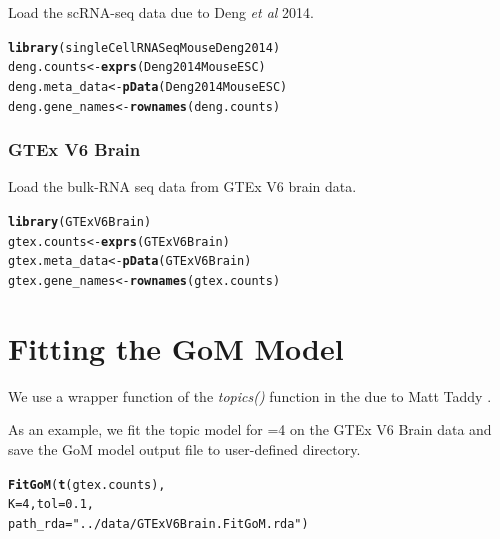 \documentclass[12pt]{article}\usepackage[]{graphicx}\usepackage[usenames,dvipsnames]{color}
\makeatletter
\newcommand{\hlnum}[1]{\textcolor[rgb]{0.686,0.059,0.569}{#1}}%
\newcommand{\hlstr}[1]{\textcolor[rgb]{0.192,0.494,0.8}{#1}}%
\newcommand{\hlstd}[1]{\textcolor[rgb]{0.345,0.345,0.345}{#1}}%
\newcommand{\hlkwb}[1]{\textcolor[rgb]{0.69,0.353,0.396}{#1}}%
\newcommand{\hlkwc}[1]{\textcolor[rgb]{0.333,0.667,0.333}{#1}}%
\newcommand{\hlkwd}[1]{\textcolor[rgb]{0.737,0.353,0.396}{\textbf{#1}}}%
\newenvironment{kframe}{%
 \def\at@end@of@kframe{}%
 \ifinner\ifhmode%
  \def\at@end@of@kframe{\end{minipage}}%
  \begin{minipage}{\columnwidth}%
 \fi\fi%
 \def\FrameCommand##1{\hskip\@totalleftmargin \hskip-\fboxsep
 \colorbox{shadecolor}{##1}\hskip-\fboxsep
     \hskip-\linewidth \hskip-\@totalleftmargin \hskip\columnwidth}%
 \MakeFramed {\advance\hsize-\width
   \@totalleftmargin\z@ \linewidth\hsize
   \@setminipage}}%
 {\par\unskip\endMakeFramed%
 \at@end@of@kframe}
\newenvironment{knitrout}{}{} %
\makeatother
\begin{document}
Load the scRNA-seq data due to Deng \textit{et al} 2014.

\begin{knitrout}
\color{fgcolor}\begin{kframe}
\begin{alltt}
\hlkwd{library}\hlstd{(singleCellRNASeqMouseDeng2014)}
\hlstd{deng.counts} \hlkwb{<-} \hlkwd{exprs}\hlstd{(Deng2014MouseESC)}
\hlstd{deng.meta_data} \hlkwb{<-} \hlkwd{pData}\hlstd{(Deng2014MouseESC)}
\hlstd{deng.gene_names} \hlkwb{<-} \hlkwd{rownames}\hlstd{(deng.counts)}
\end{alltt}
\end{kframe}
\end{knitrout}

\subsubsection{GTEx V6 Brain}

Load the bulk-RNA seq data from GTEx V6 brain data.

\begin{knitrout}
\color{fgcolor}\begin{kframe}
\begin{alltt}
\hlkwd{library}\hlstd{(GTExV6Brain)}
\hlstd{gtex.counts} \hlkwb{<-} \hlkwd{exprs}\hlstd{(GTExV6Brain)}
\hlstd{gtex.meta_data} \hlkwb{<-} \hlkwd{pData}\hlstd{(GTExV6Brain)}
\hlstd{gtex.gene_names} \hlkwb{<-} \hlkwd{rownames}\hlstd{(gtex.counts)}
\end{alltt}
\end{kframe}
\end{knitrout}


\section{Fitting the GoM Model}

We use a wrapper function of the \textit{topics()} function in the  due to Matt Taddy \cite{Taddy2012}.

As an example, we fit the topic model for =4 on the GTEx V6 Brain data and save the GoM model output file to user-defined directory.

\begin{knitrout}
\color{fgcolor}\begin{kframe}
\begin{alltt}
\hlkwd{FitGoM}\hlstd{(}\hlkwd{t}\hlstd{(gtex.counts),}
            \hlkwc{K}\hlstd{=}\hlnum{4}\hlstd{,} \hlkwc{tol}\hlstd{=}\hlnum{0.1}\hlstd{,}
            \hlkwc{path_rda}\hlstd{=}\hlstr{"../data/GTExV6Brain.FitGoM.rda"}\hlstd{)}
\end{alltt}
\end{kframe}
\end{knitrout}
\end{document}
